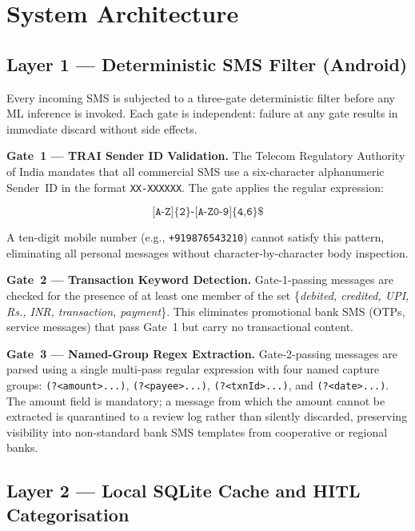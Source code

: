 \documentclass[conference]{IEEEtran}
\begin{document}
\section{System Architecture}

\subsection{Layer 1 --- Deterministic SMS Filter (Android)}

Every incoming SMS is subjected to a three-gate deterministic filter before
any ML inference is invoked. Each gate is independent: failure at any gate
results in immediate discard without side effects.

\textbf{Gate~1 --- TRAI Sender ID Validation.}
The Telecom Regulatory Authority of India mandates that all commercial SMS
use a six-character alphanumeric Sender~ID in the format
\texttt{XX-XXXXXX}. The gate applies the regular expression:

\begin{equation*}
    \texttt{\^{}[A-Z]\{2\}-[A-Z0-9]\{4,6\}\$}
\end{equation*}

A ten-digit mobile number (e.g., \texttt{+919876543210}) cannot satisfy this
pattern, eliminating all personal messages without character-by-character
body inspection.

\textbf{Gate~2 --- Transaction Keyword Detection.}
Gate-1-passing messages are checked for the presence of at least one member
of the set \{\textit{debited, credited, UPI, Rs., INR, transaction,
payment}\}. This eliminates promotional bank SMS (OTPs, service messages)
that pass Gate~1 but carry no transactional content.

\textbf{Gate~3 --- Named-Group Regex Extraction.}
Gate-2-passing messages are parsed using a single multi-pass regular
expression with four named capture groups: \texttt{(?<amount>...)},
\texttt{(?<payee>...)}, \texttt{(?<txnId>...)}, and
\texttt{(?<date>...)}. The amount field is mandatory; a message from
which the amount cannot be extracted is quarantined to a review log rather
than silently discarded, preserving visibility into non-standard bank SMS
templates from cooperative or regional banks.

\subsection{Layer 2 --- Local SQLite Cache and HITL Categorisation}
\end{document}
